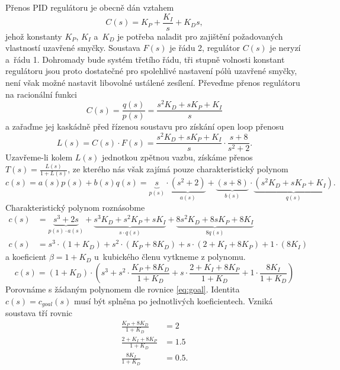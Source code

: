 \documentclass[twoside]{article}
\begin{document}
Přenos PID regulátoru je obecně dán vztahem
\begin{equation}
	C(s) = K_P + \frac{K_I}{s} + K_D s,
\end{equation}
jehož konstanty $K_P$, $K_I$ a~$K_D$ je potřeba naladit pro zajištění požadovaných vlastností uzavřené smyčky.
Soustava $F(s)$ je řádu 2, regulátor $C(s)$ je neryzí a~řádu 1. Dohromady bude systém třetího řádu, tři stupně volnosti
konstant regulátoru jsou proto dostatečné pro spolehlivé nastavení pólů uzavřené smyčky,
není však možné nastavit libovolné ustálené zesílení.
Převeďme přenos regulátoru na racionální funkci
\begin{equation}
	C(s) = \frac{q(s)}{p(s)} = \frac{s^2 K_D + s K_P + K_I}{s}
\end{equation}
a zařaďme jej kaskádně před řízenou soustavu pro získání open loop přenosu
\begin{equation}
	L(s) = C(s) \cdot F(s) = \frac{s^2 K_D + s K_P + K_I}{s} \cdot \frac{s+8} {s^2 + 2}.
\end{equation}
Uzavřeme-li kolem $L(s)$ jednotkou zpětnou vazbu, získáme přenos $T(s) = \frac{L(s)}{1 + L(s)}$, ze kterého nás však zajímá
pouze charakteristický polynom
\begin{equation}
	c(s) = a(s)p(s) + b(s)q(s) =\underbrace{s}_{p(s)} \cdot \underbrace{(s^2 + 2)}_{a(s)} 
	+ \underbrace{(s+8)}_{b(s)} \cdot \underbrace{(s^2 K_D + s K_P + K_I)}_{q(s)}.
\end{equation}
Charakteristický polynom roznásobme
\begin{equation}
	\begin{split}
		c(s) &= \underbrace{s^3 + 2s}_{p(s)\cdot a(s)} + \underbrace{s^3 K_D + s^2 K_P + s K_I}_{s\cdot q(s)} +\underbrace{ 8 s^2 K_D + 8s K_P +8 K_I}_{8 q(s)} \\
		c(s) &= s^3 \cdot (1 + K_D) + s^2 \cdot(K_P + 8K_D) + s \cdot(2 + K_I + 8K_P) + 1 \cdot (8K_I)
	\end{split}
\end{equation}
a koeficient $\beta = 1 + K_D$ u~kubického členu vytkneme z polynomu.
\begin{equation}
	c(s) = (1 + K_D) \cdot( s^3 + s^2 \cdot \frac{K_P + 8K_D}{1 + K_D} + s \cdot  \frac{2 + K_I + 8K_P}{1 + K_D} + 1 \cdot \frac{8K_I}{1 + K_D})
\end{equation}
Porovnáme s žádaným polynomem dle rovnice \eqref{eq:goal}. Identita $c(s) = c_{goal}(s)$ musí být splněna po jednotlivých koeficientech.
Vzniká soustava tří rovnic
\begin{equation}
	\begin{split}
		\frac{K_P + 8K_D}{1 + K_D} &= 2 \\
		\frac{2 + K_I + 8K_P}{1 + K_D} &= 1.5\\
		\frac{8K_I}{1 + K_D} &= 0.5.
	\end{split}
\end{equation}
\end{document}
